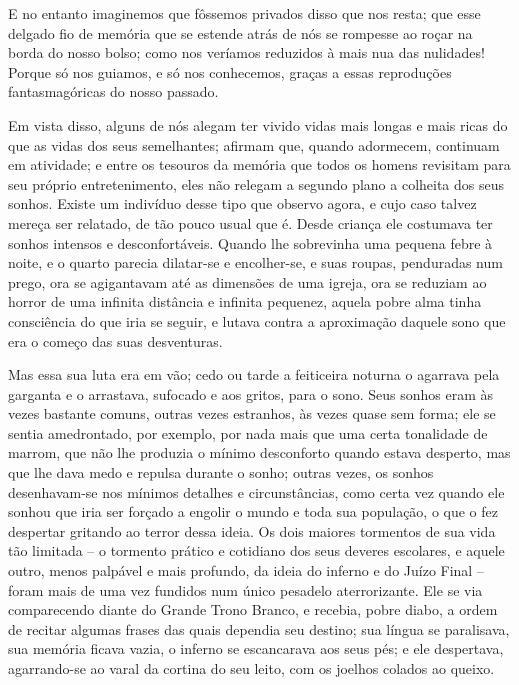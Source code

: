 E no entanto imaginemos que fôssemos privados disso que nos resta; que
esse delgado fio de memória que se estende atrás de nós se rompesse ao
roçar na borda do nosso bolso; como nos veríamos reduzidos à mais nua
das nulidades!  Porque só nos guiamos, e só nos conhecemos, graças a
essas reproduções fantasmagóricas do nosso passado.

Em vista disso, alguns de nós alegam ter vivido vidas mais longas e mais
ricas do que as vidas dos seus semelhantes; afirmam que, quando
adormecem, continuam em atividade; e entre os tesouros da memória que
todos os homens revisitam para seu próprio entretenimento, eles não
relegam a segundo plano a colheita dos seus sonhos.  Existe um
indivíduo desse tipo que observo agora, e cujo caso talvez mereça ser
relatado, de tão pouco usual que é.  Desde criança ele costumava ter
sonhos intensos e desconfortáveis.  Quando lhe sobrevinha uma pequena
febre à noite, e o quarto parecia dilatar-se e encolher-se, e suas
roupas, penduradas num prego, ora se agigantavam até as dimensões de
uma igreja, ora se reduziam ao horror de uma infinita distância e
infinita pequenez, aquela pobre alma tinha consciência do que iria se
seguir, e lutava contra a aproximação daquele sono que era o começo das
suas desventuras.

Mas essa sua luta era em vão; cedo ou tarde a feiticeira noturna o
agarrava pela garganta e o arrastava, sufocado e aos gritos, para o
sono.  Seus sonhos eram às vezes bastante comuns, outras vezes
estranhos, às vezes quase sem forma; ele se sentia amedrontado, por
exemplo, por nada mais que uma certa tonalidade de marrom, que não lhe
produzia o mínimo desconforto quando estava desperto, mas que lhe dava
medo e repulsa durante o sonho; outras vezes, os sonhos desenhavam-se
nos mínimos detalhes e circunstâncias, como certa vez quando ele sonhou
que iria ser forçado a engolir o mundo e toda sua população, o que o
fez despertar gritando ao terror dessa ideia.  Os dois maiores
tormentos de sua vida tão limitada -- o tormento prático e cotidiano dos
seus deveres escolares, e aquele outro, menos palpável e mais profundo,
da ideia do inferno e do Juízo Final -- foram mais de uma vez fundidos
num único pesadelo aterrorizante.  Ele se via comparecendo diante do
Grande Trono Branco, e recebia, pobre diabo, a ordem de recitar algumas
frases das quais dependia seu destino; sua língua se paralisava, sua
memória ficava vazia, o inferno se escancarava aos seus pés; e ele
despertava, agarrando-se ao varal da cortina do seu leito, com os
joelhos colados ao queixo.

